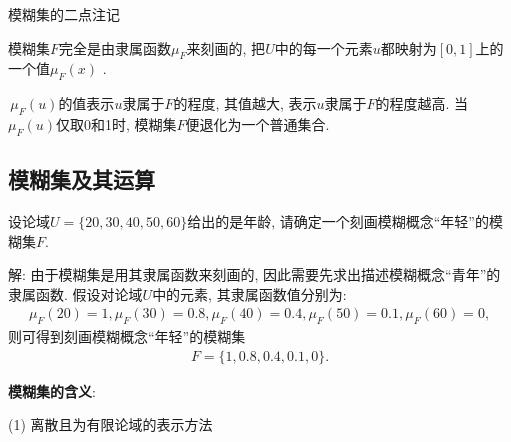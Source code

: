 \begin{remark}模糊集的二点注记

 模糊集$F$完全是由隶属函数$\mu_{F}$来刻画的, 把$U$中的每一个元素$u$都映射为$[0, 1]$上的一个值$\mu_F(x)$ .

 \,$\mu_F(u)$的值表示$u$隶属于$F$的程度, 其值越大, 表示$u$隶属于$F$的程度越高. 当$\mu_F(u)$仅取0和1时, 模糊集$F$便退化为一个普通集合.
\end{remark}
\subsection{模糊集及其运算}
\begin{example}\label{AIC5Fuzzyexam551}
    设论域$U=\{20, 30, 40, 50, 60\}$给出的是年龄, 请确定一个刻画模糊概念“年轻”的模糊集$F$.
\end{example}

解: 由于模糊集是用其隶属函数来刻画的, 因此需要先求出描述模糊概念“青年”的隶属函数. 假设对论域$U$中的元素, 其隶属函数值分别为:
\begin{align}
    \mu_{F}(20)=1, \mu_{F}(30)=0.8, \mu_{F}(40)=0.4, \mu_{F}(50)=0.1, \mu_{F}(60)=0,
\end{align}
则可得到刻画模糊概念“年轻”的模糊集
\begin{align}
    F=\{ 1, 0.8, 0.4, 0.1, 0\}.
\end{align}

\textbf{模糊集的含义}:

(1) 离散且为有限论域的表示方法

